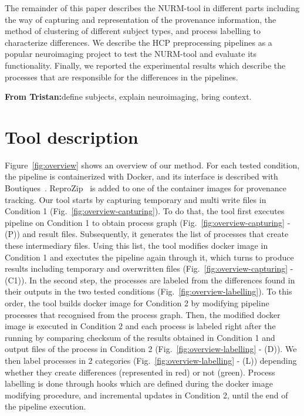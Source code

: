 \documentclass[a4paper,num-refs]{oup-contemporary}
\newcommand{\reprozip}[0]{ReproZip\xspace}
\newcommand{\tristan}[1]{\color{blue}\textbf{From Tristan:}#1\color{black}}
\begin{document}
The remainder of this paper describes the NURM-tool in different parts 
including the way of capturing and representation of the provenance 
information, the method of clustering of different subject types, and 
process labelling to characterize differences. We describe the HCP 
preprocessing pipelines as a popular neuroimaging project to test the 
NURM-tool and evaluate its functionality. Finally, we reported the 
experimental results which describe the processes that are responsible 
for the differences in the pipelines.

\tristan{define subjects, explain neuroimaging, bring context.}
\section{Tool description}

Figure~\ref{fig:overview} shows an overview of our method. For
each tested condition, the pipeline is containerized with Docker, and its
interface is described with Boutiques~\cite{glatard2017boutiques}.
\reprozip~\cite{Chirigati2016} is added to one of the container images for
provenance tracking. 
Our tool starts by capturing temporary and multi write files in Condition 1 
(Fig.~\ref{fig:overview-capturing}). 
To do that, the tool first executes pipeline on Condition 1 to obtain process graph 
(Fig.~\ref{fig:overview-capturing} - (P)) and 
result files. Subsequently, it generates the list of processes that create these intermediary files. 
Using this list, the tool modifies docker image in Condition 1 and exectutes the pipeline 
again through it, which turns to produce results including temporary and overwritten
files (Fig.~\ref{fig:overview-capturing} - (C1)).
In the second step, the processes are labeled from 
the differences found in their outputs in the
two tested conditions (Fig.~\ref{fig:overview-labelling}). To this order, 
the tool builds docker image for Condition 2 by modifying pipeline processes that 
recognised from 
the process graph. Then, the modified docker image is executed in Condition 2 and 
each process is labeled right 
after the running by comparing checksum of the results obtained in Condition 1 
and output files of the process in Condition 2 (Fig.~\ref{fig:overview-labelling} - (D)). 
We then label processes in 2 categories (Fig.~\ref{fig:overview-labelling} -
(L)) depending whether they create differences (represented in red) or not (green). 
Process labelling is done through hooks which are defined during the docker image modifying procedure, 
and incremental updates in Condition 2, 
until the end of the pipeline execution.
\end{document}
